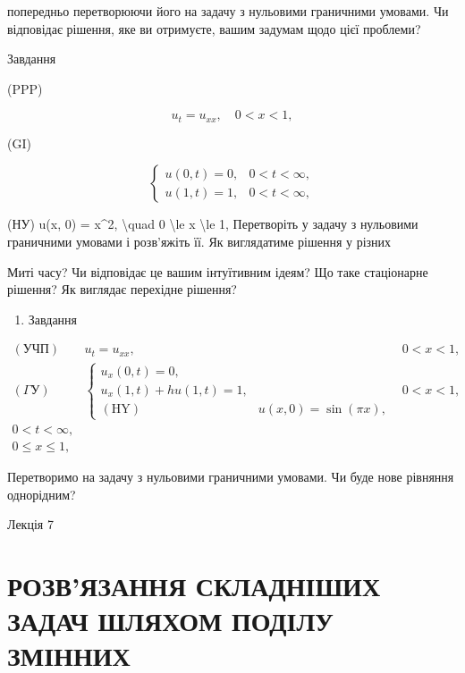 \documentclass[
]{article}
\providecommand{\tightlist}{%
  \setlength{\itemsep}{0pt}\setlength{\parskip}{0pt}}
\begin{document}
попередньо перетворюючи його на задачу з нульовими граничними умовами.
Чи відповідає рішення, яке ви отримуєте, вашим задумам щодо цієї
проблеми?

Завдання

(PPP)

\[
u_t = u_{xx}, \quad 0 < x < 1,
\]

(GI)

\[
\begin{cases} u(0, t) = 0, & 0 < t < \infty, \\ u(1, t) = 1, & 0 < t < \infty, \end{cases}
\]

(НУ) u(x, 0) = x\^{}2, \textbackslash quad 0 \textbackslash le x
\textbackslash le 1, Перетворіть у задачу з нульовими граничними умовами
і розв'яжіть її. Як виглядатиме рішення у різних

Миті часу? Чи відповідає це вашим інтуїтивним ідеям? Що таке стаціонарне
рішення? Як виглядає перехідне рішення?

\begin{enumerate}
\def\labelenumi{\arabic{enumi}.}
\setcounter{enumi}{2}
\tightlist
\item
  Завдання
\end{enumerate}

\[
\begin{aligned} (\text{УЧП}) & u_t = u_{xx}, & 0 < x < 1, \\ (\Gamma \text{У}) & \begin{cases} u_x(0, t) = 0, \\ u_x(1, t) + hu(1, t) = 1, \\ (\text{HY}) & u(x, 0) = \sin(\pi x), \end{cases} & 0 < x < 1, \\ 0 < t < \infty, \\ 0 \le x \le 1, \end{aligned}
\]

Перетворимо на задачу з нульовими граничними умовами. Чи буде нове
рівняння однорідним?

Лекція 7

\section{РОЗВ'ЯЗАННЯ СКЛАДНІШИХ ЗАДАЧ ШЛЯХОМ ПОДІЛУ
ЗМІННИХ}\label{ux440ux43eux437ux432ux44fux437ux430ux43dux43dux44f-ux441ux43aux43bux430ux434ux43dux456ux448ux438ux445-ux437ux430ux434ux430ux447-ux448ux43bux44fux445ux43eux43c-ux43fux43eux434ux456ux43bux443-ux437ux43cux456ux43dux43dux438ux445}
\end{document}
